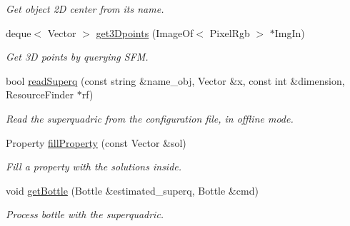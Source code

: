 \begin{DoxyCompactItemize}
\begin{DoxyCompactList}\small\item\em Get object 2\-D center from its name. \end{DoxyCompactList}\item 
deque$<$ Vector $>$ \hyperlink{classExperimentOne_a4c489f3fed0a7bac019895adb66807cb}{get3\-Dpoints} (Image\-Of$<$ Pixel\-Rgb $>$ $\ast$Img\-In)
\begin{DoxyCompactList}\small\item\em Get 3\-D points by querying S\-F\-M. \end{DoxyCompactList}\item 
bool \hyperlink{classExperimentOne_aa6abe663d8234c25e19460370cde408e}{read\-Superq} (const string \&name\-\_\-obj, Vector \&x, const int \&dimension, Resource\-Finder $\ast$rf)
\begin{DoxyCompactList}\small\item\em Read the superquadric from the configuration file, in offline mode. \end{DoxyCompactList}\item 
Property \hyperlink{classExperimentOne_a725e2b788b64d85d38e33b8d52ed5d02}{fill\-Property} (const Vector \&sol)
\begin{DoxyCompactList}\small\item\em Fill a property with the solutions inside. \end{DoxyCompactList}\item 
void \hyperlink{classExperimentOne_a0c8125d92c65d43c55c97adc32c5c576}{get\-Bottle} (Bottle \&estimated\-\_\-superq, Bottle \&cmd)\label{classExperimentOne_a0c8125d92c65d43c55c97adc32c5c576}

\begin{DoxyCompactList}\small\item\em Process bottle with the superquadric. \end{DoxyCompactList}\end{DoxyCompactItemize}
